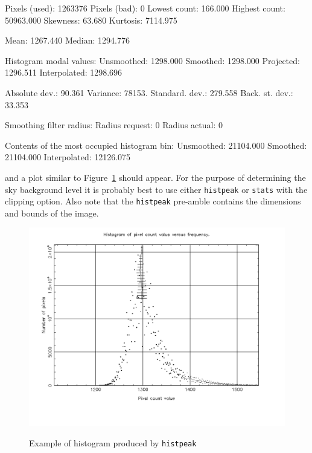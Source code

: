\documentclass[twoside,11pt]{starlink}
\begin{document}
\begin{enumerate}
\begin{small}
\begin{terminalv}
Pixels (used):            1263376     Pixels (bad):                0
Lowest count:             166.000     Highest count:       50963.000
Skewness:                  63.680     Kurtosis:             7114.975

Mean:                    1267.440     Median:               1294.776

Histogram modal values:
Unsmoothed:              1298.000     Smoothed:             1298.000
Projected:               1296.511     Interpolated:         1298.696

Absolute dev.:             90.361     Variance:               78153.
Standard. dev.:           279.558     Back. st. dev.:         33.353

Smoothing filter radius:
Radius request:                 0     Radius actual:               0

Contents of the most occupied histogram bin:
Unsmoothed:             21104.000     Smoothed:            21104.000
Interpolated:           12126.075
\end{terminalv}
\end{small}

   and a plot similar to Figure~\ref{HISTPEAK} should appear.  For the
   purpose of determining the sky background level it is probably best
   to use either \texttt{histpeak} or \texttt{stats} with the clipping option.
   Also note that the \texttt{histpeak} pre-amble contains the dimensions and
   bounds of the image.

\end{enumerate}

\begin{figure}[htbp]
   \centering
   \includegraphics[totalheight=4in]{sc5_histpeak}
   \begin{quote}
   \caption{Example of histogram produced by \texttt{histpeak}
   \label{HISTPEAK} }
   \end{quote}
\end{figure}
\end{document}
